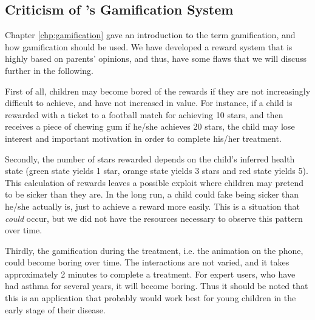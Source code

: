 \subsection{Criticism of \app{}'s Gamification System}
Chapter \ref{chp:gamification} gave an introduction to the term gamification, and how gamification should be used. We have developed a reward system that is highly based on parents' opinions, and thus, have some flaws that we will discuss further in the following. 

First of all, children may become bored of the rewards if they are not increasingly difficult to achieve, and have not increased in value. For instance, if a child is rewarded with a ticket to a football match for achieving 10 stars, and then receives a piece of chewing gum if he/she achieves 20 stars, the child may lose interest and important motivation in order to complete his/her treatment. 

Secondly, the number of stars rewarded depends on the child's inferred health state (green state yields 1 star, orange state yields 3 stars and red state yields 5). This calculation of rewards leaves a possible exploit where children may pretend to be sicker than they are. In the long run, a child could fake being sicker than he/she actually is, just to achieve a reward more easily. This is a situation that \emph{could} occur, but we did not have the resources necessary to observe this pattern over time.

Thirdly, the gamification during the treatment, i.e. the animation on the phone, could become boring over time. 
The interactions are not varied, and it takes approximately 2 minutes to complete a treatment. For expert users, who have had asthma for several years, it will become boring. Thus it should be noted that this is an application that probably would work best for young children in the early stage of their disease.  
